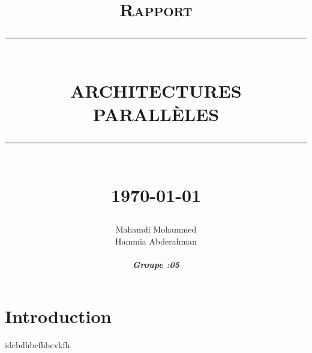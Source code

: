 \documentclass[12pt]{report}
\newcommand{\HRule}[1]{\rule{\linewidth}{#1}}
\begin{document}
	\renewcommand{\contentsname}{Table des Matières}
	\author{
		Mahamdi Mohammed \\ 
		Hammia Abderahman \\ \\
		\textbf{\emph{Groupe :05}}\\
			}      
	\date{} 
	
	\title{  \textsc{Rapport  }
		\\ [2.0cm]
		\HRule{0.5pt} \\
		\LARGE \textbf{\uppercase{Architectures Parallèles}}
		\HRule{2pt} \\ [0.5cm]
		\normalsize \today \vspace*{5\baselineskip}}	
	\maketitle
	\tableofcontents
	\renewcommand{\contentsname}
	\newpage
	
	\sectionfont{\scshape}
	
	\newpage
	\section*{Introduction}
	  idcbdhbcfhbcvkfh
	   	
	
	
	
	
	\newpage
\end{document}
